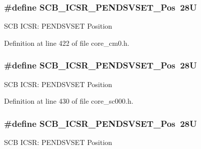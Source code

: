 \subsubsection[{\texorpdfstring{S\+C\+B\+\_\+\+I\+C\+S\+R\+\_\+\+P\+E\+N\+D\+S\+V\+S\+E\+T\+\_\+\+Pos}{SCB_ICSR_PENDSVSET_Pos}}]{\setlength{\rightskip}{0pt plus 5cm}\#define S\+C\+B\+\_\+\+I\+C\+S\+R\+\_\+\+P\+E\+N\+D\+S\+V\+S\+E\+T\+\_\+\+Pos~28U}\hypertarget{group___c_m_s_i_s___s_c_b_gab5ded23d2ab1d5ff7cc7ce746205e9fe}{}\label{group___c_m_s_i_s___s_c_b_gab5ded23d2ab1d5ff7cc7ce746205e9fe}
S\+CB I\+C\+SR\+: P\+E\+N\+D\+S\+V\+S\+ET Position 

Definition at line 422 of file core\+\_\+cm0.\+h.

\subsubsection[{\texorpdfstring{S\+C\+B\+\_\+\+I\+C\+S\+R\+\_\+\+P\+E\+N\+D\+S\+V\+S\+E\+T\+\_\+\+Pos}{SCB_ICSR_PENDSVSET_Pos}}]{\setlength{\rightskip}{0pt plus 5cm}\#define S\+C\+B\+\_\+\+I\+C\+S\+R\+\_\+\+P\+E\+N\+D\+S\+V\+S\+E\+T\+\_\+\+Pos~28U}\hypertarget{group___c_m_s_i_s___s_c_b_gab5ded23d2ab1d5ff7cc7ce746205e9fe}{}\label{group___c_m_s_i_s___s_c_b_gab5ded23d2ab1d5ff7cc7ce746205e9fe}
S\+CB I\+C\+SR\+: P\+E\+N\+D\+S\+V\+S\+ET Position 

Definition at line 430 of file core\+\_\+sc000.\+h.

\subsubsection[{\texorpdfstring{S\+C\+B\+\_\+\+I\+C\+S\+R\+\_\+\+P\+E\+N\+D\+S\+V\+S\+E\+T\+\_\+\+Pos}{SCB_ICSR_PENDSVSET_Pos}}]{\setlength{\rightskip}{0pt plus 5cm}\#define S\+C\+B\+\_\+\+I\+C\+S\+R\+\_\+\+P\+E\+N\+D\+S\+V\+S\+E\+T\+\_\+\+Pos~28U}\hypertarget{group___c_m_s_i_s___s_c_b_gab5ded23d2ab1d5ff7cc7ce746205e9fe}{}\label{group___c_m_s_i_s___s_c_b_gab5ded23d2ab1d5ff7cc7ce746205e9fe}
S\+CB I\+C\+SR\+: P\+E\+N\+D\+S\+V\+S\+ET Position 

